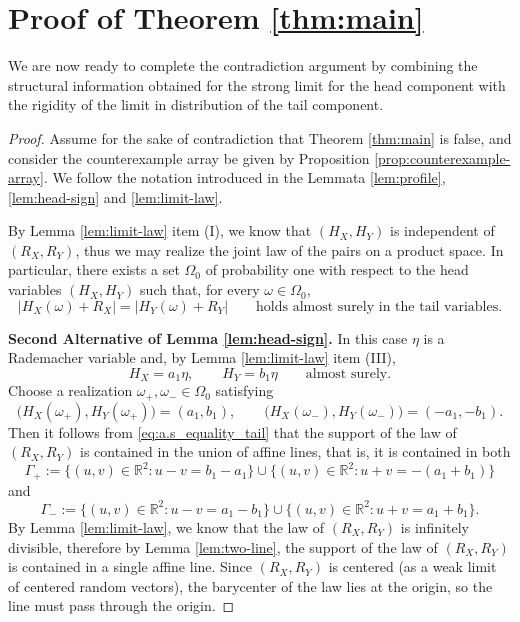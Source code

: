 \documentclass[11pt]{amsart}
\newcommand{\R}{\mathbb R}
\begin{document}
\section{Proof of Theorem \ref{thm:main}}

We are now ready to complete the contradiction argument by combining the structural
information obtained for the strong limit for the head component with the rigidity of the limit in distribution of the tail component.

\begin{proof}
Assume for the sake of contradiction that Theorem \ref{thm:main} is false, and consider the counterexample array be
given by Proposition \ref{prop:counterexample-array}. We follow the notation introduced in the 
Lemmata \ref{lem:profile}, \ref{lem:head-sign} and \ref{lem:limit-law}.

By Lemma \ref{lem:limit-law} item (I), we know that $(H_X,H_Y)$ is independent of $(R_X,R_Y)$, thus we may realize the joint law of the pairs
on a product space. In particular, there exists a set $\Omega_0$ of probability
one with respect to the head variables $(H_X,H_Y)$ such that, for every $\omega \in \Omega_0$,
\begin{equation}
\label{eq:a.s_equality_tail}
|H_X(\omega)+R_X| = |H_Y(\omega)+R_Y|
\qquad
\text{holds almost surely in the tail variables.}
\end{equation}

\textbf{Second Alternative of Lemma
\ref{lem:head-sign}.}
In this case $\eta$ is a Rademacher variable and, by Lemma
\ref{lem:limit-law} item (III),
\[
H_X = a_1 \eta,
\qquad
H_Y = b_1 \eta
\qquad
\text{almost surely.}
\]
Choose a realization $\omega_+,\omega_- \in \Omega_0$ satisfying
\[
\bigl(H_X(\omega_+),H_Y(\omega_+)\bigr)=(a_1,b_1),
\qquad
\bigl(H_X(\omega_-),H_Y(\omega_-)\bigr)=(-a_1,-b_1).
\]
Then it follows from \eqref{eq:a.s_equality_tail} that the support of the law of $(R_X,R_Y)$ is contained in the union of affine lines, that is, it is contained in both
\[
\Gamma_+
:=
\{(u,v)\in\R^2 : u-v=b_1-a_1\}
\cup
\{(u,v)\in\R^2 : u+v=-(a_1+b_1)\}
\]
and
\[
\Gamma_-
:=
\{(u,v)\in\R^2 : u-v=a_1-b_1\}
\cup
\{(u,v)\in\R^2 : u+v=a_1+b_1\}.
\]
By Lemma \ref{lem:limit-law}, we know that the law of $(R_X,R_Y)$ is infinitely divisible, therefore by Lemma \ref{lem:two-line}, the support of the law of $(R_X,R_Y)$ is
contained in a single affine line. Since $(R_X,R_Y)$ is centered (as a weak
limit of centered random vectors), the barycenter of the law lies at the
origin, so the line must pass through the origin.


\end{proof}
\end{document}
